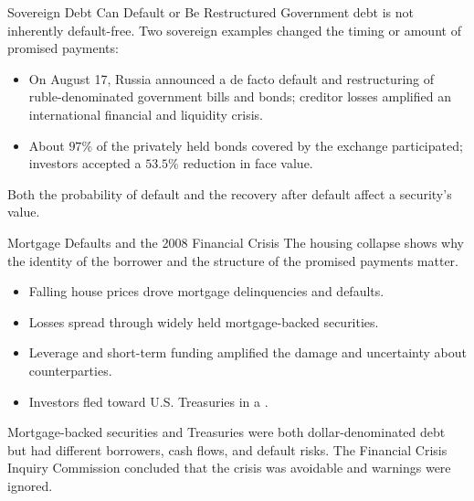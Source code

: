 \documentclass[aspectratio=169,11pt]{beamer}
\begin{document}
\begin{frame}{Sovereign Debt Can Default or Be Restructured}
  Government debt is not inherently default-free. Two sovereign examples changed
  the timing or amount of promised payments:

  \vspace{0.6em}
  \begin{itemize}\setlength{\itemsep}{0.65em}
    \item \textbf{} On August 17, Russia announced a de facto
      default and restructuring of ruble-denominated government bills and bonds;
      creditor losses amplified an international financial and liquidity crisis.
    \item \textbf{} About $97\%$ of the privately held bonds
      covered by the exchange participated; investors accepted a $53.5\%$
      reduction in face value.
  \end{itemize}

  \vspace{0.35em}
  Both the probability of default and the recovery after default affect a
  security's value.

\end{frame}

\begin{frame}{Mortgage Defaults and the 2008 Financial Crisis}
  The housing collapse shows why the identity of the borrower and the structure
  of the promised payments matter.

  \vspace{0.55em}
  \begin{itemize}\setlength{\itemsep}{0.45em}
    \item Falling house prices drove mortgage delinquencies and defaults.
    \item Losses spread through widely held mortgage-backed securities.
    \item Leverage and short-term funding amplified the damage and uncertainty
      about counterparties.
    \item Investors fled toward U.S. Treasuries in a .
  \end{itemize}

  \vspace{0.35em}
  Mortgage-backed securities and Treasuries were both dollar-denominated debt but
  had different borrowers, cash flows, and default risks. The Financial Crisis
  Inquiry Commission concluded that the crisis was avoidable and warnings were
  ignored.

\end{frame}
\end{document}
